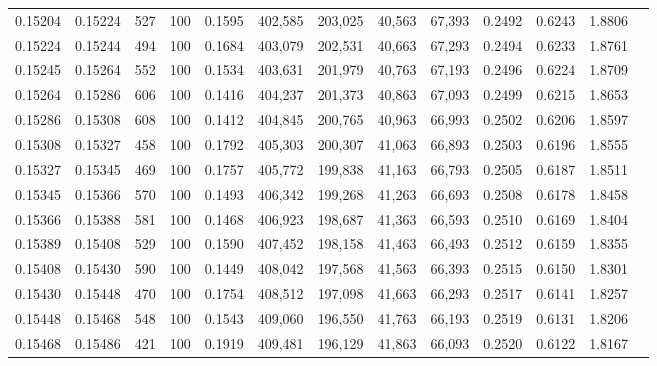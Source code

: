 \begin{tabular}{rrrrrrrrrrrrr}
0.15204 & 0.15224 &   527 & 100 &                                     0.1595 & 402,585 & 203,025 &  40,563 &  67,393 & 0.2492 & 0.6243 & 1.8806 \\
0.15224 & 0.15244 &   494 & 100 &                                     0.1684 & 403,079 & 202,531 &  40,663 &  67,293 & 0.2494 & 0.6233 & 1.8761 \\
0.15245 & 0.15264 &   552 & 100 &                                     0.1534 & 403,631 & 201,979 &  40,763 &  67,193 & 0.2496 & 0.6224 & 1.8709 \\
0.15264 & 0.15286 &   606 & 100 &                                     0.1416 & 404,237 & 201,373 &  40,863 &  67,093 & 0.2499 & 0.6215 & 1.8653 \\
0.15286 & 0.15308 &   608 & 100 &                                     0.1412 & 404,845 & 200,765 &  40,963 &  66,993 & 0.2502 & 0.6206 & 1.8597 \\
0.15308 & 0.15327 &   458 & 100 &                                     0.1792 & 405,303 & 200,307 &  41,063 &  66,893 & 0.2503 & 0.6196 & 1.8555 \\
0.15327 & 0.15345 &   469 & 100 &                                     0.1757 & 405,772 & 199,838 &  41,163 &  66,793 & 0.2505 & 0.6187 & 1.8511 \\
0.15345 & 0.15366 &   570 & 100 &                                     0.1493 & 406,342 & 199,268 &  41,263 &  66,693 & 0.2508 & 0.6178 & 1.8458 \\
0.15366 & 0.15388 &   581 & 100 &                                     0.1468 & 406,923 & 198,687 &  41,363 &  66,593 & 0.2510 & 0.6169 & 1.8404 \\
0.15389 & 0.15408 &   529 & 100 &                                     0.1590 & 407,452 & 198,158 &  41,463 &  66,493 & 0.2512 & 0.6159 & 1.8355 \\
0.15408 & 0.15430 &   590 & 100 &                                     0.1449 & 408,042 & 197,568 &  41,563 &  66,393 & 0.2515 & 0.6150 & 1.8301 \\
0.15430 & 0.15448 &   470 & 100 &                                     0.1754 & 408,512 & 197,098 &  41,663 &  66,293 & 0.2517 & 0.6141 & 1.8257 \\
0.15448 & 0.15468 &   548 & 100 &                                     0.1543 & 409,060 & 196,550 &  41,763 &  66,193 & 0.2519 & 0.6131 & 1.8206 \\
0.15468 & 0.15486 &   421 & 100 &                                     0.1919 & 409,481 & 196,129 &  41,863 &  66,093 & 0.2520 & 0.6122 & 1.8167 \\

\end{tabular}
